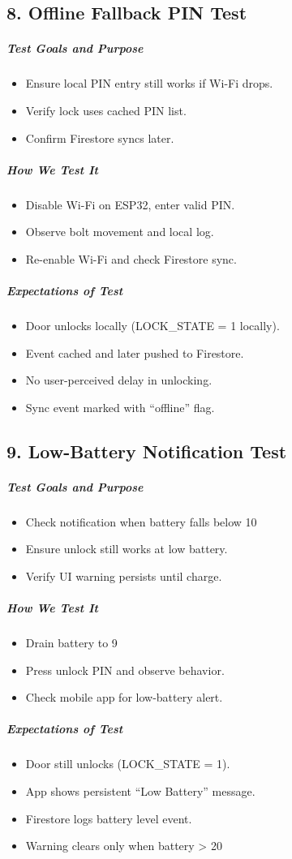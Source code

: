 \subsection*{8. Offline Fallback PIN Test}
\subparagraph{Test Goals and Purpose}
\begin{itemize}
    \item Ensure local PIN entry still works if Wi-Fi drops.
    \item Verify lock uses cached PIN list.
    \item Confirm Firestore syncs later.
\end{itemize}
\subparagraph{How We Test It}
\begin{itemize}
    \item Disable Wi-Fi on ESP32, enter valid PIN.
    \item Observe bolt movement and local log.
    \item Re-enable Wi-Fi and check Firestore sync.
\end{itemize}
\subparagraph{Expectations of Test}
\begin{itemize}
    \item Door unlocks locally (LOCK\_STATE = 1 locally).
    \item Event cached and later pushed to Firestore.
    \item No user-perceived delay in unlocking.
    \item Sync event marked with “offline” flag.
\end{itemize}

\subsection*{9. Low-Battery Notification Test}
\subparagraph{Test Goals and Purpose}
\begin{itemize}
    \item Check notification when battery falls below 10 %
    \item Ensure unlock still works at low battery.
    \item Verify UI warning persists until charge.
\end{itemize}
\subparagraph{How We Test It}
\begin{itemize}
    \item Drain battery to 9 %
    \item Press unlock PIN and observe behavior.
    \item Check mobile app for low-battery alert.
\end{itemize}
\subparagraph{Expectations of Test}
\begin{itemize}
    \item Door still unlocks (LOCK\_STATE = 1).
    \item App shows persistent “Low Battery” message.
    \item Firestore logs battery level event.
    \item Warning clears only when battery > 20 %
\end{itemize}


